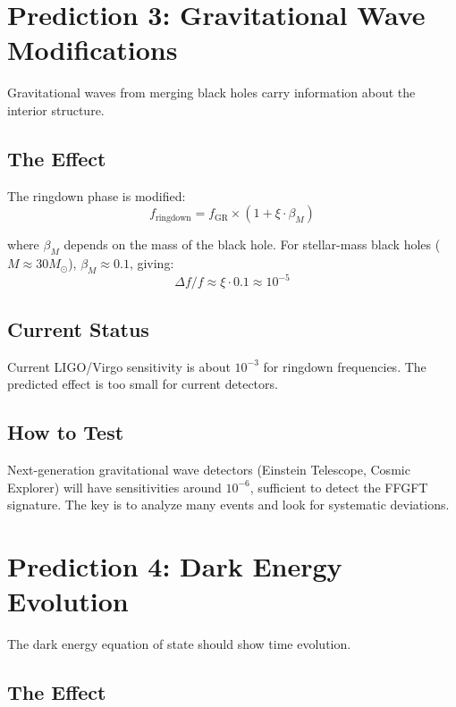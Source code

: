 \section{Prediction 3: Gravitational Wave Modifications}

Gravitational waves from merging black holes carry information about the interior structure.

\subsection{The Effect}

The ringdown phase is modified:
\begin{equation}
f_{\text{ringdown}} = f_{\text{GR}} \times (1 + \xi \cdot \beta_M)
\end{equation}

where $\beta_M$ depends on the mass of the black hole. For stellar-mass black holes ($M \approx 30 M_\odot$), $\beta_M \approx 0.1$, giving:
\begin{equation}
\Delta f / f \approx \xi \cdot 0.1 \approx 10^{-5}
\end{equation}

\subsection{Current Status}

Current LIGO/Virgo sensitivity is about $10^{-3}$ for ringdown frequencies. The predicted effect is too small for current detectors.

\subsection{How to Test}

Next-generation gravitational wave detectors (Einstein Telescope, Cosmic Explorer) will have sensitivities around $10^{-6}$, sufficient to detect the FFGFT signature. The key is to analyze many events and look for systematic deviations.

\section{Prediction 4: Dark Energy Evolution}

The dark energy equation of state should show time evolution.

\subsection{The Effect}

